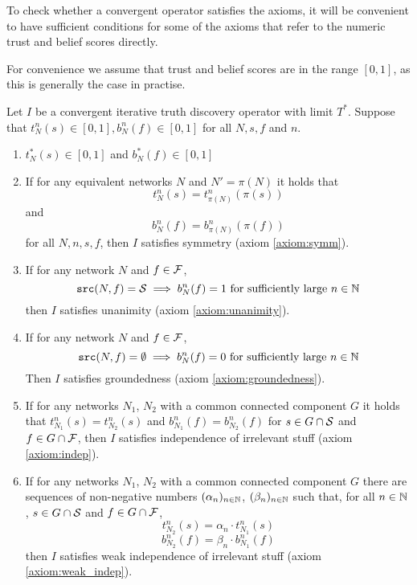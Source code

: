 \documentclass[../main.tex]{subfiles}
\begin{document}

To check whether a convergent operator satisfies the axioms, it will be
convenient to have sufficient conditions for some of the axioms that refer to
the numeric trust and belief scores directly.

For convenience we assume that trust and belief scores are in the range $[0,
1]$, as this is generally the case in practise.

\begin{lemma}
\label{lemma:iterative_axiom_suff_conds}
Let $I$ be a convergent iterative truth discovery operator with limit
$T^*$. Suppose that $t_N^n(s) \in [0, 1], b_N^n(f) \in [0, 1]$ for all $N, s,
f$ and $n$.

\begin{enumerate}
    \item $t_N^*(s) \in [0, 1]$ and $b_N^*(f) \in [0, 1]$

    \item If for any equivalent networks $N$ and $N'=\pi(N)$ it holds that
    \[
        t_N^n(s) = t_{\pi(N)}^n(\pi(s))
    \]
    and
    \[
        b_N^n(f) = b_{\pi(N)}^n(\pi(f))
    \]
    for all $N, n, s, f$, then $I$ satisfies symmetry (axiom \ref{axiom:symm}).

    \item If for any network $N$ and $f \in \F$,
    \[
        \src(N, f) = \S \implies b_N^n(f) = 1 \text{ for sufficiently large }
            n \in \Nat
    \]
    then $I$ satisfies unanimity (axiom \ref{axiom:unanimity}).

    \item If for any network $N$ and $f \in \F$,
    \[
        \src(N, f) = \emptyset \implies b_N^n(f) = 0
            \text{ for sufficiently large } n \in \Nat
    \]
    Then $I$ satisfies groundedness (axiom \ref{axiom:groundedness}).

    \item If for any networks $N_1$, $N_2$ with a common connected component
    $G$ it holds that $t_{N_1}^n(s) = t_{N_2}^n(s)$ and $b_{N_1}^n(f) =
    b_{N_2}^n(f)$ for $s \in G \cap \S$ and $f \in G \cap \F$, then $I$
    satisfies independence of irrelevant stuff (axiom \ref{axiom:indep}).

    \item If for any networks $N_1$, $N_2$ with a common connected component
    $G$ there are sequences of non-negative numbers $(\alpha_n)_{n \in \Nat}$,
    $(\beta_n)_{n \in \Nat}$ such that, for all $n \in \Nat$, $s \in G \cap \S$
    and $f \in G \cap \F$,
        \[ t_{N_2}^n(s) = \alpha_n \cdot t_{N_1}^n(s) \]
        \[ b_{N_2}^n(f) = \beta_n \cdot b_{N_1}^n(f) \]
    then $I$ satisfies weak independence of irrelevant stuff (axiom
    \ref{axiom:weak_indep}).

\end{enumerate}
\end{lemma}
\end{document}
